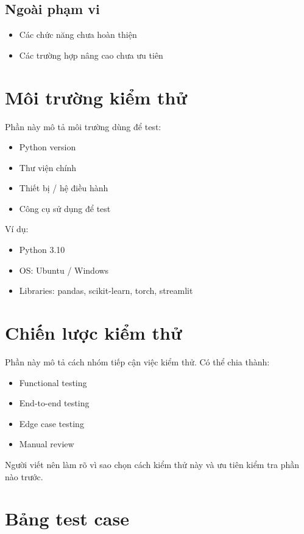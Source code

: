\documentclass[12pt]{ai_conquer2026}
\begin{document}
\subsection{Ngoài phạm vi}
\begin{itemize}
    \item Các chức năng chưa hoàn thiện
    \item Các trường hợp nâng cao chưa ưu tiên 
\end{itemize}

\section{Môi trường kiểm thử}

Phần này mô tả môi trường dùng để test:
\begin{itemize}
    \item Python version
    \item Thư viện chính
    \item Thiết bị / hệ điều hành
    \item Công cụ sử dụng để test
\end{itemize}

Ví dụ:
\begin{itemize}
    \item Python 3.10
    \item OS: Ubuntu / Windows
    \item Libraries: pandas, scikit-learn, torch, streamlit
\end{itemize}

\section{Chiến lược kiểm thử}

Phần này mô tả cách nhóm tiếp cận việc kiểm thử. Có thể chia thành:
\begin{itemize}
    \item Functional testing
    \item End-to-end testing
    \item Edge case testing
    \item Manual review
\end{itemize}

Người viết nên làm rõ vì sao chọn cách kiểm thử này và ưu tiên kiểm tra phần nào trước.

\section{Bảng test case}
\end{document}
